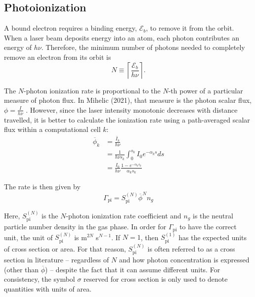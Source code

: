 \subsection{Photoionization}
\label{sect:photoionization}
A bound electron requires a binding energy, $\mathcal{E}_b$, to remove it from the orbit. When a laser beam deposits energy into an atom, each photon contributes an energy of $h\nu$. Therefore, the minimum number of
photons needed to completely remove an electron from its orbit is
\begin{equation}
    N \equiv \left\lceil \frac{\mathcal{E}_b}{h\nu} \right\rceil.
\end{equation}

The $N$-photon ionization rate is proportional to the $N$-th power of a particular measure of photon flux. In Mihelic (2021), that measure is the photon scalar flux, $\displaystyle \phi = \frac{I}{h\nu}$ \cite{Mihelic}. However,
since the laser intensity monotonic decreases with distance travelled, it is better to calculate the ionization rate using a path-averaged scalar flux within a computational cell $k$:
\begin{subequations}
    \begin{align}
        \overline{\phi}_k &= \frac{\overline{I}_k}{h\nu} \\
        &= \frac{1}{h\nu s_k} \int_{0}^{s_k} I_0 e^{-\alpha_k s} ds \\
        &= \frac{I_0}{h\nu} \frac{1 - e^{-\alpha_k s_k}}{\alpha_k s_k}
    \end{align}
\end{subequations}

The rate is then given by
\begin{equation}
    \Gamma_{\text{pi}} = S_{\text{pi}}^{(N)} \overline{\phi}^N n_g
    \label{eqn:photoionization_rate}
\end{equation}

Here, $S_{\text{pi}}^{(N)}$ is the $N$-photon ionization rate coefficient and $n_g$ is the neutral particle number density in the gas phase. In order for $\Gamma_{\text{pi}}$ to have the correct unit, the unit of
$S_{\text{pi}}^{(N)}$ is m$^{2N}$ s$^{N-1}$. If $N = 1$, then $S_{\text{pi}}^{(1)}$ has the expected units of cross section or area. For that reason, $S_{\text{pi}}^{(N)}$ is often referred to as a cross section
in literature -- regardless of $N$ and how photon concentration is expressed (other than $\overline{\phi}$) -- despite the fact that it can assume different units. For consistency, the symbol $\sigma$ reserved for
cross section is only used to denote quantities with units of area.

